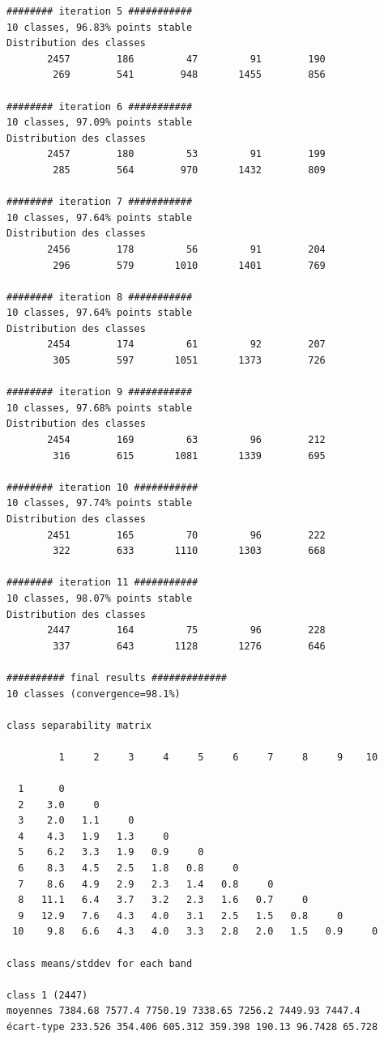 \documentclass[land,article,submit,pdftex,moreauthors]{Definitions/mdpi}
\begin{document}
\begin{scriptsize}
\begin{verbatim}
######## iteration 5 ###########
10 classes, 96.83% points stable
Distribution des classes
       2457        186         47         91        190
        269        541        948       1455        856

######## iteration 6 ###########
10 classes, 97.09% points stable
Distribution des classes
       2457        180         53         91        199
        285        564        970       1432        809

######## iteration 7 ###########
10 classes, 97.64% points stable
Distribution des classes
       2456        178         56         91        204
        296        579       1010       1401        769

######## iteration 8 ###########
10 classes, 97.64% points stable
Distribution des classes
       2454        174         61         92        207
        305        597       1051       1373        726

######## iteration 9 ###########
10 classes, 97.68% points stable
Distribution des classes
       2454        169         63         96        212
        316        615       1081       1339        695

######## iteration 10 ###########
10 classes, 97.74% points stable
Distribution des classes
       2451        165         70         96        222
        322        633       1110       1303        668

######## iteration 11 ###########
10 classes, 98.07% points stable
Distribution des classes
       2447        164         75         96        228
        337        643       1128       1276        646

########## final results #############
10 classes (convergence=98.1%)

class separability matrix

         1     2     3     4     5     6     7     8     9    10

  1      0
  2    3.0     0
  3    2.0   1.1     0
  4    4.3   1.9   1.3     0
  5    6.2   3.3   1.9   0.9     0
  6    8.3   4.5   2.5   1.8   0.8     0
  7    8.6   4.9   2.9   2.3   1.4   0.8     0
  8   11.1   6.4   3.7   3.2   2.3   1.6   0.7     0
  9   12.9   7.6   4.3   4.0   3.1   2.5   1.5   0.8     0
 10    9.8   6.6   4.3   4.0   3.3   2.8   2.0   1.5   0.9     0

class means/stddev for each band

class 1 (2447)
moyennes 7384.68 7577.4 7750.19 7338.65 7256.2 7449.93 7447.4
écart-type 233.526 354.406 605.312 359.398 190.13 96.7428 65.728


\end{verbatim}
\end{scriptsize}
\end{document}
